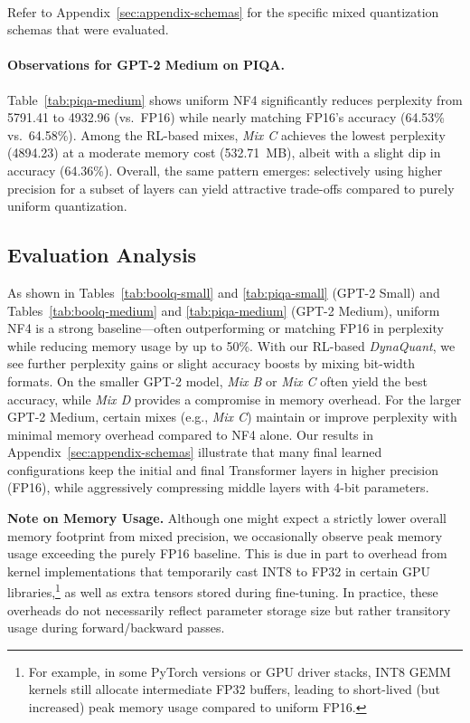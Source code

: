 \documentclass{article}
\begin{document}
	\textbf{}
	\\
	\small{Refer to Appendix~\ref{sec:appendix-schemas} for the specific mixed quantization schemas that were evaluated.}
	
	
	\paragraph{Observations for GPT-2 Medium on PIQA.}
	Table~\ref{tab:piqa-medium} shows uniform NF4 significantly reduces perplexity from 5791.41 to 4932.96 (vs.\ FP16) while nearly matching FP16's accuracy (64.53\% vs.\ 64.58\%). Among the RL-based mixes, \emph{Mix C} achieves the lowest perplexity (4894.23) at a moderate memory cost (532.71~MB), albeit with a slight dip in accuracy (64.36\%). Overall, the same pattern emerges: selectively using higher precision for a subset of layers can yield attractive trade-offs compared to purely uniform quantization.
	
	\subsection{Evaluation Analysis}
	
	As shown in Tables~\ref{tab:boolq-small} and \ref{tab:piqa-small} (GPT-2 Small) and Tables~\ref{tab:boolq-medium} and \ref{tab:piqa-medium} (GPT-2 Medium), uniform NF4 is a strong baseline—often outperforming or matching FP16 in perplexity while reducing memory usage by up to 50\%. With our RL-based \emph{DynaQuant}, we see further perplexity gains or slight accuracy boosts by mixing bit-width formats. On the smaller GPT-2 model, \emph{Mix B} or \emph{Mix C} often yield the best accuracy, while \emph{Mix D} provides a compromise in memory overhead. For the larger GPT-2 Medium, certain mixes (e.g., \emph{Mix C}) maintain or improve perplexity with minimal memory overhead compared to NF4 alone. Our results in Appendix~\ref{sec:appendix-schemas} illustrate that many final learned configurations keep the initial and final Transformer layers in higher precision (FP16), while aggressively compressing middle layers with 4-bit parameters.
	
	\textbf{Note on Memory Usage.} Although one might expect a strictly lower overall memory footprint from mixed precision, we occasionally observe peak memory usage exceeding the purely FP16 baseline. This is due in part to overhead from kernel implementations that temporarily cast INT8 to FP32 in certain GPU libraries,\footnote{ For example, in some PyTorch versions or GPU driver stacks, INT8 GEMM kernels still allocate intermediate FP32 buffers, leading to short-lived (but increased) peak memory usage compared to uniform FP16.} as well as extra tensors stored during fine-tuning. In practice, these overheads do not necessarily reflect parameter storage size but rather transitory usage during forward/backward passes.
	
\end{document}
